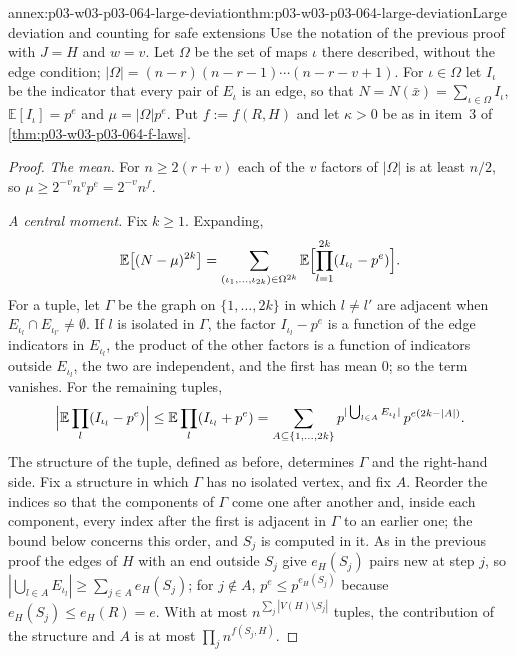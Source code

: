 \begin{annexitem}{annex:p03-w03-p03-064-large-deviation}{thm:p03-w03-p03-064-large-deviation}{Large deviation and counting for safe extensions}
Use the notation of the previous proof with \(J=H\) and \(w=v\).  Let
\(\Omega\) be the set of maps \(\iota\) there described, without the edge
condition; \(|\Omega|=(n-r)(n-r-1)\cdots(n-r-v+1)\).  For \(\iota\in\Omega\)
let \(I_\iota\) be the indicator that every pair of \(E_\iota\) is an edge,
so that \(N=N(\bar x)=\sum_{\iota\in\Omega}I_\iota\),
\(\mathbb E[I_\iota]=p^e\) and \(\mu=|\Omega|p^e\).  Put \(f:=f(R,H)\) and
let \(\kappa>0\) be as in item~3 of \cref{thm:p03-w03-p03-064-f-laws}.
\begin{proof}
\emph{The mean.}  For \(n\geq2(r+v)\) each of the \(v\) factors of
\(|\Omega|\) is at least \(n/2\), so \(\mu\geq2^{-v}n^vp^e=2^{-v}n^f\).

\emph{A central moment.}  Fix \(k\geq1\).  Expanding,
\[
  \mathbb E\bigl[(N-\mu)^{2k}\bigr]=\sum_{(\iota_1,\ldots,\iota_{2k})\in
  \Omega^{2k}}\mathbb E\Bigl[\prod_{l=1}^{2k}(I_{\iota_l}-p^e)\Bigr].
\]
For a tuple, let \(\Gamma\) be the graph on \(\{1,\ldots,2k\}\) in which
\(l\neq l'\) are adjacent when \(E_{\iota_l}\cap E_{\iota_{l'}}\neq\emptyset\).
If \(l\) is isolated in \(\Gamma\), the factor \(I_{\iota_l}-p^e\) is a
function of the edge indicators in \(E_{\iota_l}\), the product of the other
factors is a function of indicators outside \(E_{\iota_l}\), the two are
independent, and the first has mean \(0\); so the term vanishes.  For the
remaining tuples,
\[
  \Bigl|\mathbb E\prod_l(I_{\iota_l}-p^e)\Bigr|\leq
  \mathbb E\prod_l(I_{\iota_l}+p^e)=\sum_{A\subseteq\{1,\ldots,2k\}}
  p^{|\bigcup_{l\in A}E_{\iota_l}|}\,p^{e(2k-|A|)}.
\]
The structure of the tuple, defined as before, determines \(\Gamma\) and the
right-hand side.  Fix a structure in which \(\Gamma\) has no isolated vertex,
and fix \(A\).  Reorder the indices so that the components of \(\Gamma\) come
one after another and, inside each component, every index after the first is
adjacent in \(\Gamma\) to an earlier one; the bound below concerns this order,
and \(S_j\) is computed in it.  As in the previous proof the edges of \(H\)
with an end outside \(S_j\) give \(e_H(S_j)\) pairs new at step \(j\), so
\(|\bigcup_{l\in A}E_{\iota_l}|\geq\sum_{j\in A}e_H(S_j)\); for \(j\notin A\),
\(p^e\leq p^{e_H(S_j)}\) because \(e_H(S_j)\leq e_H(R)=e\).  With at most
\(n^{\sum_j|V(H)\setminus S_j|}\) tuples, the contribution of the structure
and \(A\) is at most \(\prod_jn^{f(S_j,H)}\).


\end{proof}
\end{annexitem}
